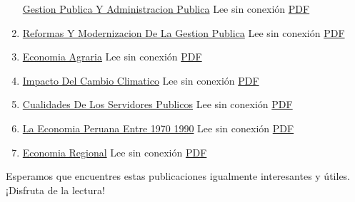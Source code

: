 \documentclass[
  stu,
  floatsintext,
  longtable,
  a4paper,
  nolmodern,
  notxfonts,
  notimes,
  colorlinks=true,linkcolor=blue,citecolor=blue,urlcolor=blue]{apa7}
\begin{document}
\begin{enumerate}
  \href{https://achalmaedison.netlify.app/blog/posts/2021-10-01-gestion-publica-y-administracion-publica}{Gestion
  Publica Y Administracion Publica} Lee sin conexión
  \href{https://achalmaedison.netlify.app/blog/posts/2021-10-01-gestion-publica-y-administracion-publica/index.pdf}{PDF}
\item
  \href{https://achalmaedison.netlify.app/blog/posts/2021-10-01-reformas-y-modernizacion-de-la-gestion-publica}{Reformas
  Y Modernizacion De La Gestion Publica} Lee sin conexión
  \href{https://achalmaedison.netlify.app/blog/posts/2021-10-01-reformas-y-modernizacion-de-la-gestion-publica/index.pdf}{PDF}
\item
  \href{https://achalmaedison.netlify.app/blog/posts/2022-04-22-economia-agraria}{Economia
  Agraria} Lee sin conexión
  \href{https://achalmaedison.netlify.app/blog/posts/2022-04-22-economia-agraria/index.pdf}{PDF}
\item
  \href{https://achalmaedison.netlify.app/blog/posts/2022-06-02-impacto-del-cambio-climatico}{Impacto
  Del Cambio Climatico} Lee sin conexión
  \href{https://achalmaedison.netlify.app/blog/posts/2022-06-02-impacto-del-cambio-climatico/index.pdf}{PDF}
\item
  \href{https://achalmaedison.netlify.app/blog/posts/2023-05-11-cualidades-de-los-servidores-publicos}{Cualidades
  De Los Servidores Publicos} Lee sin conexión
  \href{https://achalmaedison.netlify.app/blog/posts/2023-05-11-cualidades-de-los-servidores-publicos/index.pdf}{PDF}
\item
  \href{https://achalmaedison.netlify.app/blog/posts/2023-05-12-la-economia-peruana-entre-1970-1990}{La
  Economia Peruana Entre 1970 1990} Lee sin conexión
  \href{https://achalmaedison.netlify.app/blog/posts/2023-05-12-la-economia-peruana-entre-1970-1990/index.pdf}{PDF}
\item
  \href{https://achalmaedison.netlify.app/blog/posts/2023-05-16-economia-regional}{Economia
  Regional} Lee sin conexión
  \href{https://achalmaedison.netlify.app/blog/posts/2023-05-16-economia-regional/index.pdf}{PDF}
\end{enumerate}

Esperamos que encuentres estas publicaciones igualmente interesantes y
útiles. ¡Disfruta de la lectura!
\end{document}

